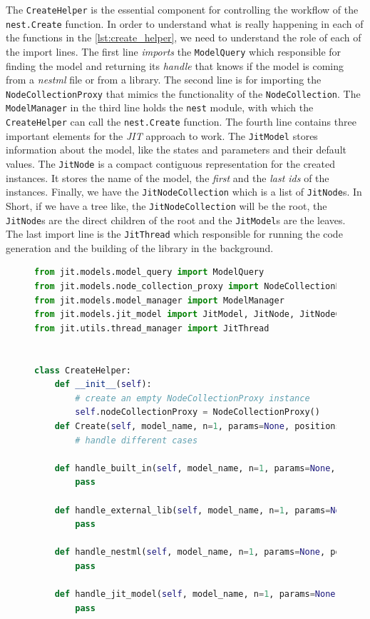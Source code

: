 The \texttt{CreateHelper} is the essential component for controlling the workflow of the \texttt{nest.Create} function. In order to understand what is really happening in each of the functions in the \autoref{lst:create_helper}, we need to understand the role of each of the import lines. The first line \emph{imports} the \texttt{ModelQuery} which responsible for finding the model and returning its \emph{handle} that knows if the model is coming from a \emph{nestml} file or from a library. The second line is for importing the \texttt{NodeCollectionProxy} that mimics the functionality of the \texttt{NodeCollection}. The \texttt{ModelManager} in the third line holds the \texttt{nest} module, with which the \texttt{CreateHelper} can call the \texttt{nest.Create} function. The fourth line contains three important elements for the \emph{JIT} approach to work. The \texttt{JitModel} stores information about the model, like the states and parameters and their default values. The \texttt{JitNode} is a compact contiguous representation for the created instances. It stores the name of the model, the \emph{first} and the \emph{last ids} of the instances. Finally, we have the \texttt{JitNodeCollection} which is a list of \texttt{JitNode}s. In Short, if we have a tree like, the \texttt{JitNodeCollection} will be the root, the \texttt{JitNode}s are the direct children of the root and the \texttt{JitModel}s are the leaves. The last import line is the \texttt{JitThread} which responsible for running the code generation and the building of the library in the background.
\begin{figure}[ht!]
    \centering
    \begin{lstlisting}[language=Python, label=lst:create_helper, caption={The CreateHelper}]
from jit.models.model_query import ModelQuery
from jit.models.node_collection_proxy import NodeCollectionProxy
from jit.models.model_manager import ModelManager
from jit.models.jit_model import JitModel, JitNode, JitNodeCollection
from jit.utils.thread_manager import JitThread


class CreateHelper:
    def __init__(self):
        # create an empty NodeCollectionProxy instance
        self.nodeCollectionProxy = NodeCollectionProxy()
    def Create(self, model_name, n=1, params=None, positions=None):
        # handle different cases
        
    def handle_built_in(self, model_name, n=1, params=None, positions=None):
        pass
        
    def handle_external_lib(self, model_name, n=1, params=None, positions=None):
        pass
    
    def handle_nestml(self, model_name, n=1, params=None, positions=None): 
        pass
        
    def handle_jit_model(self, model_name, n=1, params=None, positions=None):
        pass
    
\end{lstlisting}
\end{figure}

